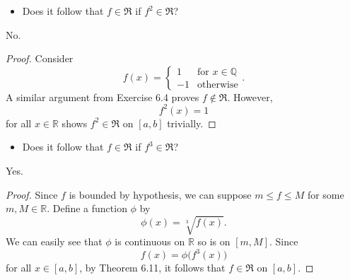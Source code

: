 \begin{Exercise}
	\begin{itemize}
		\item Does it follow that $f\in\mathfrak{R}$ if $f^2\in\mathfrak{R}$?
	\end{itemize}
	\begin{answer}
		No.
	\end{answer}
	\begin{proof}
		Consider
		$$
		f(x) = \begin{cases}
		1 & \mbox{for } x\in\mathbb{Q} \\
		-1 & \mbox{otherwise} 
		\end{cases}.
		$$
		A similar argument from Exercise 6.4 proves $f\notin\mathfrak{R}$.
		However, 
		$$
		f^2(x) = 1
		$$
		for all $x\in\mathbb{R}$ shows $f^2\in\mathfrak{R}$ on $[a,b]$ trivially.
	\end{proof}
	
	\begin{itemize}
		\item Does it follow that $f\in\mathfrak{R}$ if $f^3\in\mathfrak{R}$?
	\end{itemize}
	\begin{answer}
		Yes.
	\end{answer}
	\begin{proof}
		Since $f$ is bounded by hypothesis, we can suppose $m \leq f \leq M$ for some $m,M\in\mathbb{R}$.
		Define a function $\phi$ by
		$$
		\phi(x) = \sqrt[3]{f(x)}.
		$$
		We can easily see that $\phi$ is continuous on $\mathbb{R}$ so is on $[m,M]$.
		Since
		$$
		f(x) = \phi\big( f^3(x) \big)
		$$
		for all $x\in[a,b]$, by Theorem 6.11, it follows that $f\in\mathfrak{R}$ on $[a,b]$.
	\end{proof}
\end{Exercise}